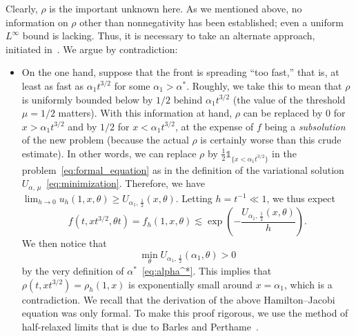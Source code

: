 \documentclass[10pt]{amsart}
\theoremstyle{definition}\newtheorem{defi}[theo]{Definition}\newtheorem{rema}[theo]{Remark}\newtheorem{exam}[theo]{Example}\newtheorem{exem}[theo]{Example}\newtheorem{nota}[theo]{Notation}
\newcommand{\1}{\mathds{1}}
\begin{document}
Clearly, $\rho$ is the important unknown here. As we mentioned above, no information on $\rho$ other than nonnegativity has been established; even a uniform $L^\infty$ bound is lacking. Thus, it is necessary to take an alternate approach, initiated in~\cite{BHR_acceleration}. We argue by contradiction:
\begin{itemize}
\item On the one hand, suppose that the front is spreading ``too fast,'' that is, at least as fast as $\alpha_1 t^{3/2}$ for some $\alpha_1>\alpha^*$. Roughly, we take this to mean that $\rho$ is uniformly bounded below by $1/2$ behind $\alpha_1 t^{3/2}$ (the value of the threshold $\mu = 1/2$ matters). With this information at hand, $\rho$ can be replaced by $0$ for $x > \alpha_1 t^{3/2}$ and by $1/2$ for $x < \alpha_1 t^{3/2}$, at the expense of $f$ being a \emph{subsolution} of the new problem (because the actual $\rho$ is certainly worse than this crude estimate). In other words, we can replace $\rho$ by $\frac12 \1_{\{x< \alpha_1 t^{3/2}\}}$ in the problem~\eqref{eq:formal_equation} as in the definition of the variational solution $U_{\alpha,\,\mu}$~\eqref{eq:minimization}. Therefore, we have $\lim_{h\to0} u_h(1,x,\theta) \geq U_{\alpha_1,\,\frac12}(x,\theta)$. Letting $h = t^{-1} \ll 1$, we thus expect
\begin{equation}\label{eq:parabolic_HJ_connection}
f\left(t, x t^{3/2}, \theta t\right) = f_h(1,x,\theta)
\lesssim \exp \left(- \frac{U_{\alpha_1,\,\frac12}(x,\theta)}{h} \right).
\end{equation}
We then notice that
\[
\min_\theta U_{\alpha_1,\,\frac12}\left(\alpha_1,\theta\right)>0
\]
by the very definition of $\alpha^*$~\eqref{eq:alpha^*}. This implies that $\rho(t, x t^{3/2}) = \rho_h(1,x)$ is exponentially small around $x=\alpha_1$, which is a contradiction. We recall that the derivation of the above Hamilton--Jacobi equation was only formal. To make this proof rigorous, we use the method of half-relaxed limits that is due to Barles and Perthame~\cite{barles_discontinuous_1987}.


\end{itemize}
\end{document}
